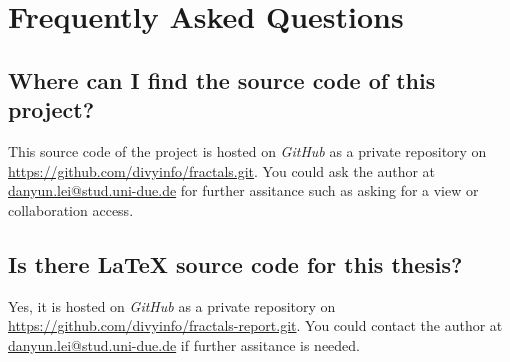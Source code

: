 
\chapter{Frequently Asked Questions} %

\label{AppendixA} %

\section{ Where can I find the source code of this project?}

This source code of the project is hosted on \emph{GitHub} as a private repository on \url{https://github.com/divyinfo/fractals.git}. You could ask the author at \href{mailto:danyun.lei@stud.uni-due.de}{danyun.lei@stud.uni-due.de} for further assitance such as asking for a view or collaboration access.

\section{ Is there \LaTeX{} source code for this thesis?}

Yes, it is hosted on \emph{GitHub} as a private repository on \url{https://github.com/divyinfo/fractals-report.git}. You could contact the author at \href{mailto:danyun.lei@stud.uni-due.de}{danyun.lei@stud.uni-due.de} if further assitance is needed.